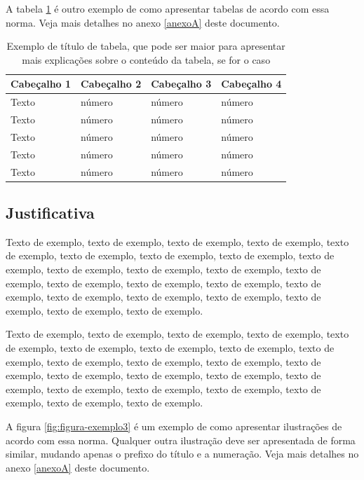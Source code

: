 \documentclass[
	12pt,				%
	oneside,			%
	a4paper,			%
	english,			%
	brazil				%
	]{abntex2ppgsi}
\begin{document}
A tabela \ref{tab:ExemploDeTabela2} é outro exemplo de como apresentar tabelas de acordo com essa norma. Veja mais detalhes no anexo \ref{anexoA} deste documento.

\begin{table}[htbp]
	\centering
	\caption{Exemplo de título de tabela, que pode ser maior para apresentar mais explicações sobre o conteúdo da tabela, se for o caso}
		\begin{tabular}{p{1.2in} p{1.2in} p{1.2in} p{1.2in} } \hline
		
		Cabeçalho 1	& Cabeçalho 2	& Cabeçalho 3	& Cabeçalho 4 \\ \hline
		Texto	& número & número	& número \\ 
		Texto	& número & número	& número \\ 
		Texto	& número & número	& número \\ 
		Texto	& número & número	& número \\ 
		Texto	& número & número	& número \\ \hline
			
		\end{tabular}
	\label{tab:ExemploDeTabela2}
\end{table}

\subsection{Justificativa}

Texto de exemplo, texto de exemplo, texto de exemplo, texto de exemplo, texto de exemplo, texto de exemplo, texto de exemplo, texto de exemplo, texto de exemplo, texto de exemplo, texto de exemplo, texto de exemplo, texto de exemplo, texto de exemplo, texto de exemplo, texto de exemplo, texto de exemplo, texto de exemplo, texto de exemplo, texto de exemplo, texto de exemplo, texto de exemplo, texto de exemplo.

Texto de exemplo, texto de exemplo, texto de exemplo, texto de exemplo, texto de exemplo, texto de exemplo, texto de exemplo, texto de exemplo, texto de exemplo, texto de exemplo, texto de exemplo, texto de exemplo, texto de exemplo, texto de exemplo, texto de exemplo, texto de exemplo, texto de exemplo, texto de exemplo, texto de exemplo, texto de exemplo, texto de exemplo, texto de exemplo, texto de exemplo.

A figura \ref{fig:figura-exemplo3} é um exemplo de como apresentar ilustrações de acordo com essa norma. Qualquer outra ilustração deve ser apresentada de forma similar, mudando apenas o prefixo do título e a numeração. Veja mais detalhes no anexo \ref{anexoA} deste documento.
\end{document}
